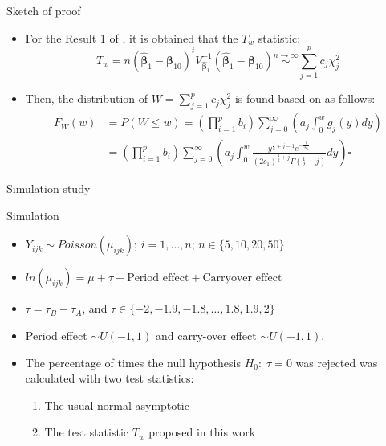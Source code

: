 \documentclass[t,9pt]{beamer}
\begin{document}
\begin{frame}[fragile]{Sketch of proof}
\begin{itemize}
    \item[3.] For the Result 1 of \cite{rk90}, it is obtained that the $T_w$ statistic:
\begin{equation}
T_w =n (\hat{\pmb{\beta}}_1- \pmb{\beta}_{10})^t V_{\hat{\pmb{ \beta}}_1}^{-1} (\hat{\pmb{\beta}}_1- \pmb{\beta}_{10}) \stackrel{n\rightarrow \infty}{\sim} \sum_{j=1}^p c_j \chi_j^2 \nonumber    
\end{equation}
\item[4.] Then, the distribution of $W=\sum_{j=1}^p c_j \chi_j^2$ is found based on \cite{raro} as follows:
\begin{align}
F_W(w)&=P(W\leq w)=\left(\prod_{i=1}^p b_i \right)\sum_{j=0}^\infty \left( a_j \int_0^w g_j(y)dy \right)\nonumber\\
&=\left(\prod_{i=1}^p b_i \right)\sum_{j=0}^\infty \left( a_j \int_0^w \frac{y^{\frac{1}{2}+j-1}e^{-\frac{y}{2c_1}}}{(2c_1)^{\frac{1}{2}+j}{ \Gamma}(\frac{1}{2}+j)} dy \right)\nonumber \square
\end{align}
\end{itemize}

\end{frame}

\begin{frame}[fragile]{Simulation study}
\begin{table}[!h]
\end{table} 
\begin{block}{Simulation}
\begin{itemize}
\item $Y_{ijk}\sim Poisson(\mu_{ijk})$; $i=1,\ldots,n$; $n \in\{5,10,20,50\}$
\item $ln(\mu_{ijk}) = \mu +\tau + \text{Period effect} + \text{Carryover effect}$
\item $\tau = \tau_B- \tau_A$, and $\tau \in\{-2, -1.9, -1.8, \ldots, 1.8, 1.9,2\}$
\item Period effect $\sim U(-1,1)$ and carry-over effect $\sim U(-1,1)$. 
\item  The percentage of times the null hypothesis $H_0: \; \tau=0$ was rejected was calculated with two test statistics: 
\begin{enumerate}
    \item  The usual normal asymptotic
    \item The test statistic $T_{w}$ proposed in this work
\end{enumerate}
\end{itemize}
\end{block}
\end{frame}
\end{document}
